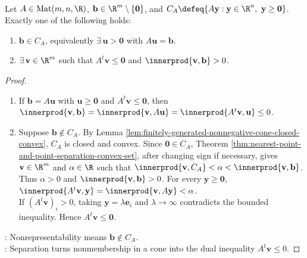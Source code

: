 \begin{theorem} \label{thm:farkas-lemma-strict-positive-system} \\
Let $A\in\operatorname{Mat}(m,n,\R)$, $\mathbf{b}\in\R^m\setminus\{\mathbf{0}\}$, and $C_A\defeq\{A\mathbf{y}:\mathbf{y}\in\R^n,\ \mathbf{y}\geq\mathbf{0}\}$.\\
Exactly one of the following holds:
\begin{enumerate}[label=(\roman*)]
\setlength{\itemsep}{0pt}
\item $\mathbf{b}\in C_A$, equivalently $\exists\,\mathbf{u}>\mathbf{0}$ with $A\mathbf{u}=\mathbf{b}$.
\item $\exists\,\mathbf{v}\in\R^m$ such that $A^t\mathbf{v}\leq\mathbf{0}$ and $\innerprod{\mathbf{v},\mathbf{b}}>0$.
\end{enumerate}
\begin{proof}
\begin{enumerate}[label=(\roman*)]
\setlength{\itemsep}{0pt}
\item If $\mathbf{b}=A\mathbf{u}$ with $\mathbf{u}\geq\mathbf{0}$ and $A^t\mathbf{v}\leq\mathbf{0}$, then $\innerprod{\mathbf{v},\mathbf{b}} =\innerprod{\mathbf{v},A\mathbf{u}} =\innerprod{A^t\mathbf{v},\mathbf{u}} \leq0$.
\item Suppose $\mathbf{b}\notin C_A$. By Lemma \ref{lem:finitely-generated-nonnegative-cone-closed-convex}, $C_A$ is closed and convex. Since $\mathbf{0}\in C_A$, Theorem \ref{thm:nearest-point-and-point-separation-convex-set}, after changing sign if necessary, gives $\mathbf{v}\in\R^m$ and $\alpha\in\R$ such that $\innerprod{\mathbf{v},C_A}<\alpha<\innerprod{\mathbf{v},\mathbf{b}}$.\\
Thus $\alpha>0$ and $\innerprod{\mathbf{v},\mathbf{b}}>0$. For every $\mathbf{y}\geq\mathbf{0}$, $\innerprod{A^t\mathbf{v},\mathbf{y}} =\innerprod{\mathbf{v},A\mathbf{y}} <\alpha$.\\
If $(A^t\mathbf{v})_i>0$, taking $\mathbf{y}=\lambda\mathbf{e}_i$ and $\lambda\to\infty$ contradicts the bounded inequality. Hence $A^t\mathbf{v}\leq\mathbf{0}$.
\end{enumerate}
: Nonrepresentability means $\mathbf{b}\notin C_A$.\\
: Separation turns nonmembership in a cone into the dual inequality $A^t\mathbf{v}\leq0$.
\end{proof}
\end{theorem}

